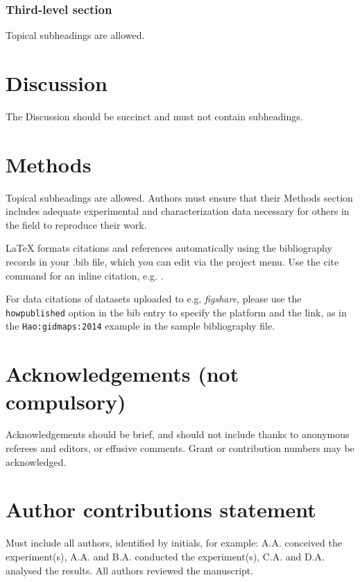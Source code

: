 \documentclass[fleqn,14pt]{wlscirep}
\begin{document}
\subsubsection*{Third-level section}
 
Topical subheadings are allowed.

\section*{Discussion}

The Discussion should be succinct and must not contain subheadings.

\section*{Methods}

Topical subheadings are allowed. Authors must ensure that their Methods section includes adequate experimental and characterization data necessary for others in the field to reproduce their work.



\noindent LaTeX formats citations and references automatically using the bibliography records in your .bib file, which you can edit via the project menu. Use the cite command for an inline citation, e.g.  \cite{Hao:gidmaps:2014}.

For data citations of datasets uploaded to e.g. \emph{figshare}, please use the \verb|howpublished| option in the bib entry to specify the platform and the link, as in the \verb|Hao:gidmaps:2014| example in the sample bibliography file.

\section*{Acknowledgements (not compulsory)}

Acknowledgements should be brief, and should not include thanks to anonymous referees and editors, or effusive comments. Grant or contribution numbers may be acknowledged.

\section*{Author contributions statement}

Must include all authors, identified by initials, for example:
A.A. conceived the experiment(s),  A.A. and B.A. conducted the experiment(s), C.A. and D.A. analysed the results.  All authors reviewed the manuscript. 
\end{document}
